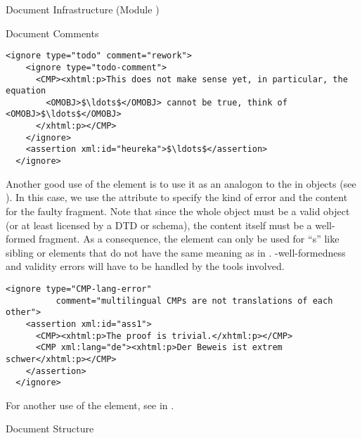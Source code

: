 \begin{tchapter}[id=omdoc-infrastructure,short=Document Infrastructure]{Document Infrastructure (Module )}
{\begin{tsection}[id=comments]{Document Comments}
\begin{lstlisting}[label=nested-ignore,numbers=none,index={ignore},mathescape]
  <ignore type="todo" comment="rework">
    <ignore type="todo-comment">
      <CMP><xhtml:p>This does not make sense yet, in particular, the equation 
        <OMOBJ>$\ldots$</OMOBJ> cannot be true, think of <OMOBJ>$\ldots$</OMOBJ>
      </xhtml:p></CMP>
    </ignore>
    <assertion xml:id="heureka">$\ldots$</assertion>
  </ignore>
\end{lstlisting}

Another good use of the  element is to use it as an analogon to the
 in {\openmath} objects (see
). In this case, we use the  attribute to
specify the kind of error and the content for the faulty \omdoc fragment. Note that
since the whole object must be a valid \omdoc object (or at least licensed by a DTD or
schema), the content itself must be a well-formed \omdoc fragment. As a consequence, the
 element can only be used for ``{s}'' like
sibling  or  elements that do not have the same meaning as
in . {\xml}-well-formedness and validity errors will have to be
handled by the {\xml} tools involved.

\begin{lstlisting}[label=lst:ignore-error,
  caption={Marking up Mathematical Errors Using \element{ignore}},
  numbers=none,index={ignore}]
  <ignore type="CMP-lang-error" 
          comment="multilingual CMPs are not translations of each other">
    <assertion xml:id="ass1">
      <CMP><xhtml:p>The proof is trivial.</xhtml:p></CMP>
      <CMP xml:lang="de"><xhtml:p>Der Beweis ist extrem schwer</xhtml:p></CMP>
    </assertion>
  </ignore>
\end{lstlisting}    
For another use of the  element, see  in
.
\end{tsection}

\begin{tsection}[id=sectioning]{Document Structure}


\end{tsection}}
\end{tchapter}
